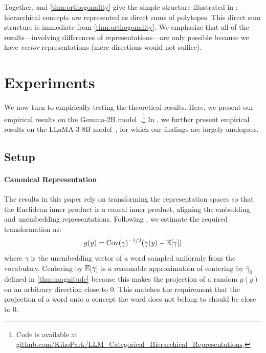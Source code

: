 \documentclass{article}
\newcommand{\cov}{\mathrm{Cov}}
\begin{document}
Together,  and \cref{thm:orthogonality} give the simple structure illustrated in : hierarchical concepts are represented as direct sums of polytopes. This direct sum structure is immediate from \cref{thm:orthogonality}.
We emphasize that all of the results---involving differences of representations---are only possible because we have \emph{vector} representations (mere directions would not suffice).

\section{Experiments}\label{sec:experiments}
We now turn to empirically testing the theoretical results. Here, we present our empirical results on the Gemma-2B model~.\footnote{Code is available at \href{https://github.com/KihoPark/LLM_Categorical_Hierarchical_Representations}{github.com/KihoPark/LLM\_Categorical\_Hierarchical\_Representations}.}
In , we further present empirical results on the LLaMA-3-8B model~\citep{dubey2024llama}, for which our findings are largely analogous.

\subsection{Setup}
\paragraph*{Canonical Representation}
The results in this paper rely on transforming the representation spaces so that the Euclidean inner product is a causal inner product, aligning the embedding and unembedding representations. Following \citet{park2024linear}, we estimate the required transformation as:
\begin{equation}
  g(y) = \cov(\gamma)^{-1/2}(\gamma(y) - \EE[\gamma])
\end{equation}
where $\gamma$ is the unembedding vector of a word sampled uniformly from the vocabulary.
Centering by $\mathbb{E}[\gamma]$ is a reasonable approximation of centering by $\bar{\gamma}_0$ defined in \cref{thm:magnitude} because this makes the projection of a random $g(y)$ on an arbitrary direction close to $0$. This matches the requirement that the projection of a word onto a concept the word does not belong to should be close to $0$.
\end{document}
